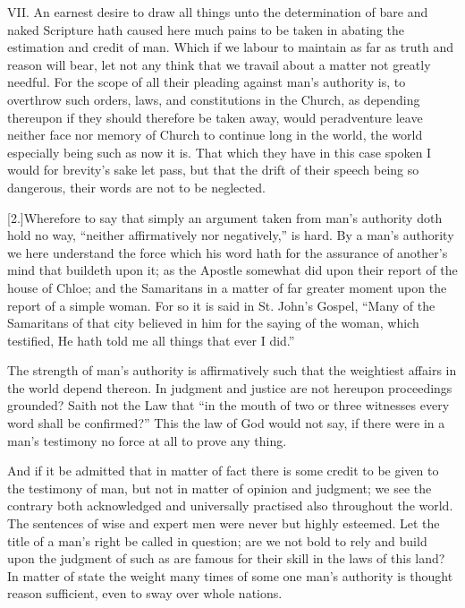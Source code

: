 VII. An earnest desire to draw all things unto the determination of bare and naked Scripture hath caused here much pains to be taken in abating the estimation and credit of man. Which if we labour to maintain as far as truth and reason will bear, let not any think that we travail about a matter not greatly needful. For the scope of all their pleading against man’s authority is, to overthrow such orders, laws, and constitutions in the Church, as depending thereupon if they should therefore be taken away, would peradventure leave neither face nor memory of Church to continue long in the world, the world especially being such as now it is. That which they have in this case spoken I would for brevity’s sake let pass, but that the drift of their speech being so dangerous, their words are not to be neglected.

[2.]Wherefore to say that simply an argument taken from man’s authority doth hold no way, “neither affirmatively nor negatively,” is hard. By a man’s authority we here understand the force which his word hath for the assurance of another’s mind that buildeth upon it; as the Apostle somewhat did upon their report of the house of Chloe; and the  Samaritans in a matter of far greater moment upon the report of a simple woman. For so it is said in St. John’s Gospel, “Many of the Samaritans of that city believed in him for the saying of the woman, which testified, He hath told me all things that ever I did.”

The strength of man’s authority is affirmatively such that the weightiest affairs in the world depend thereon. In judgment and justice are not hereupon proceedings grounded? Saith not the Law that “in the mouth of two or three witnesses every word shall be confirmed?” This the law of God would not say, if there were in a man’s testimony no force at all to prove any thing.

And if it be admitted that in matter of fact there is some credit to be given to the testimony of man, but not in matter of opinion and judgment; we see the contrary both acknowledged and universally practised also throughout the world. The sentences of wise and expert men were never but highly esteemed. Let the title of a man’s right be called in question; are we not bold to rely and build upon the judgment of such as are famous for their skill in the laws of this land? In matter of state the weight many times of some one man’s authority is thought reason sufficient, even to sway over whole nations.

